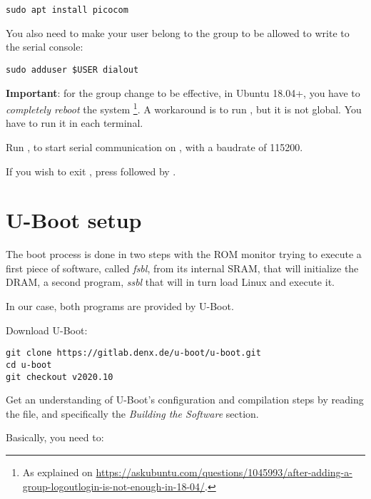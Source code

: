 \begin{verbatim}
sudo apt install picocom
\end{verbatim}

You also need to make your user belong to the  group to be
allowed to write to the serial console:

\begin{verbatim}
sudo adduser $USER dialout
\end{verbatim}

{\bf Important}: for the group change to be effective, in Ubuntu 18.04+, you have to
{\em completely reboot} the system \footnote{As explained on
\url{https://askubuntu.com/questions/1045993/after-adding-a-group-logoutlogin-is-not-enough-in-18-04/}.}.
A workaround is to run , but it is not global.
You have to run it in each terminal.

Run , to start serial
communication on , with a baudrate of 115200.

If you wish to exit , press \code{[Ctrl][a]} followed by
\code{[Ctrl][x]}.

\section{U-Boot setup}

The boot process is done in two steps with the ROM monitor trying to
execute a first piece of software, called {\em fsbl}, from its
internal SRAM, that will initialize the DRAM, a second program, {\em
ssbl} that will in turn load Linux and execute it.

In our case, both programs are provided by U-Boot.

Download U-Boot:

\begin{verbatim}
git clone https://gitlab.denx.de/u-boot/u-boot.git
cd u-boot
git checkout v2020.10
\end{verbatim}

Get an understanding of U-Boot's configuration and compilation steps
by reading the  file, and specifically the {\em Building
the Software} section.

Basically, you need to:

